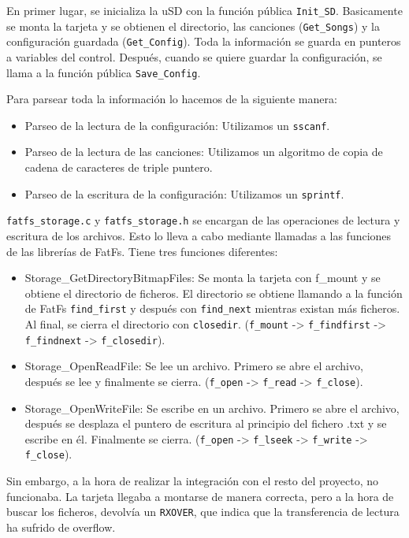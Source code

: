 En primer lugar, se inicializa la uSD con la función pública \texttt{Init\_SD}. Basicamente se monta la tarjeta y se obtienen el directorio, las canciones (\texttt{Get\_Songs}) y la configuración guardada (\texttt{Get\_Config}). Toda la información se guarda en punteros a variables del control. Después, cuando se quiere guardar la configuración, se llama a la función pública \texttt{Save\_Config}.

Para parsear toda la información lo hacemos de la siguiente manera:

\begin{itemize}
	\item Parseo de la lectura de la configuración: Utilizamos un \texttt{sscanf}.
	\item Parseo de la lectura de las canciones: Utilizamos un algoritmo de copia de cadena de caracteres de triple puntero.
	\item Parseo de la escritura de la configuración: Utilizamos un \texttt{sprintf}.
\end{itemize}

\texttt{fatfs\_storage.c} y \texttt{fatfs\_storage.h} se encargan de las operaciones de lectura y escritura de los archivos. Esto lo lleva a cabo mediante llamadas a las funciones de las librerías de FatFs. Tiene tres funciones diferentes:

\begin{itemize}
    \item Storage\_GetDirectoryBitmapFiles: Se monta la tarjeta con f\_mount y se obtiene el directorio de ficheros. El directorio se obtiene llamando a la función de FatFs \texttt{find\_first} y después con \texttt{find\_next} mientras existan más ficheros. Al final, se cierra el directorio con \texttt{closedir}. (\texttt{f\_mount} -> \texttt{f\_findfirst} -> \texttt{f\_findnext} -> \texttt{f\_closedir}).
    \item Storage\_OpenReadFile: Se lee un archivo. Primero se abre el archivo, después se lee y finalmente se cierra. (\texttt{f\_open} -> \texttt{f\_read} -> \texttt{f\_close}).
    \item Storage\_OpenWriteFile: Se escribe en un archivo. Primero se abre el archivo, después se desplaza el puntero de escritura al principio del fichero .txt y se escribe en él. Finalmente se cierra. (\texttt{f\_open} -> \texttt{f\_lseek} -> \texttt{f\_write} -> \texttt{f\_close}).
\end{itemize}

Sin embargo, a la hora de realizar la integración con el resto del proyecto, no funcionaba. La tarjeta llegaba a montarse de manera correcta, pero a la hora de buscar los ficheros, devolvía un \texttt{RXOVER}, que indica que la transferencia de lectura ha sufrido de overflow. 


